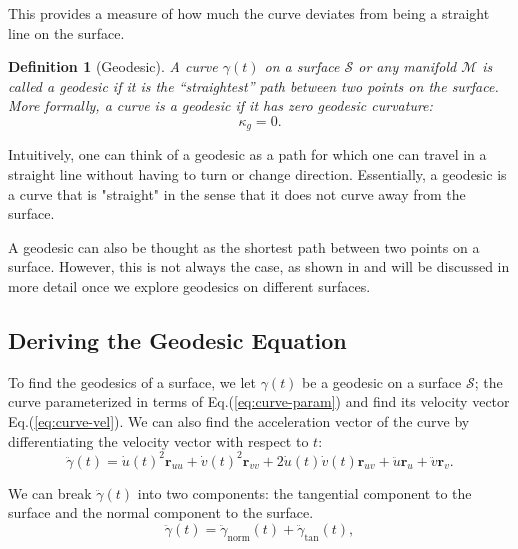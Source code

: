 \documentclass[12pt]{article}
\newtheorem{definition}{Definition}[section]
\begin{document}
This provides a measure of how much the curve deviates from being a straight line on the surface.

\begin{definition}[Geodesic]\label{def:geodesic}
	A curve $\gamma(t)$ on a surface $\mathcal{S}$ or any manifold $\mathcal{M}$ is called a \emph{geodesic} if it is the \enquote{straightest} path between two points on the surface.
	More formally, a curve is a geodesic if it has zero geodesic curvature:
	\[
		\kappa_{g} = 0.
	\]
\end{definition}
Intuitively, one can think of a geodesic as a path for which one can travel in a straight line without having to turn or change direction.
Essentially, a geodesic is a curve that is "straight" in the sense that it does not curve away from the surface.

A geodesic can also be thought as the shortest path between two points on a surface.
However, this is not always the case, as shown in \cite{jia2024geodesics} and will be discussed in more detail once we explore geodesics on different surfaces.

\subsection{Deriving the Geodesic Equation}

To find the geodesics of a surface, we let $\gamma(t)$ be a geodesic on a surface $\mathcal{S}$; the curve parameterized in terms of Eq.(\ref{eq:curve-param}) and find its velocity vector Eq.(\ref{eq:curve-vel}).
We can also find the acceleration vector of the curve by differentiating the velocity vector with respect to $t$:
\begin{equation}\label{eq:curve-acc}
	\ddot\gamma(t) = \dot{u}(t)^{2}\mathbf{r}_{uu} + \dot{v}(t)^{2}\mathbf{r}_{vv} + 2\dot{u}(t)\dot{v}(t)\mathbf{r}_{uv} + \ddot{u}\mathbf{r}_{u} + \ddot{v}\mathbf{r}_{v}.
\end{equation}

We can break $\ddot{\gamma}(t)$ into two components: the tangential component to the surface and the normal component to the surface.
\begin{equation}\label{eq:curve-acc-decomp}
	\ddot{\gamma}(t) = \ddot{\gamma}_{\text{norm}}(t) + \ddot{\gamma}_{\text{tan}}(t),
\end{equation}
\end{document}

